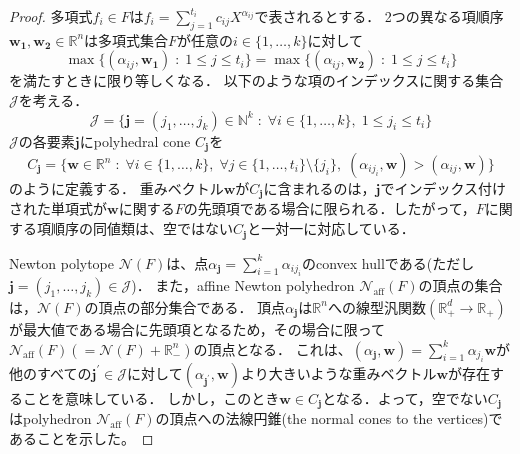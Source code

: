 \begin{proof}
	多項式$f_i \in F$は$\displaystyle f_i = \sum_{j=1}^{t_i}c_{ij}X^{\alpha_{ij}}$で表されるとする．
	2つの異なる項順序$\bm{w_1}, \bm{w_2} \in \mathbb{R}^n$は多項式集合$F$が任意の$i \in \{1, \dots, k\}$に対して
	$$\max \{(\alpha_{ij}, \bm{w_1}) \; : \; 1 \le j \le t_i\} = \max \{(\alpha_{ij}, \bm{w_2}) \; : \; 1 \le j \le t_i\}$$
	を満たすときに限り等しくなる．
	以下のような項のインデックスに関する集合$\mathcal{J}$を考える．
	$$\mathcal{J} = \{ \bm{j} = (j_1, \dots, j_k) \in \mathbb{N}^k \;:\; \forall i \in \{1, \dots, k\}, \; 1 \le j_i \le t_i\}$$
	$\mathcal{J}$の各要素$\bm{j}$にpolyhedral cone $C_{\bm{j}}$を
	$$C_{\bm{j}} = \{\bm{w} \in \mathbb{R}^n \;:\; \forall i \in \{1, \dots, k\}, \; \forall j \in \{1, \dots, t_i\} \setminus \{j_i\}, \; (\alpha_{ij_i}, \bm{w}) > (\alpha_{ij}, \bm{w}) \}$$
	のように定義する．
	重みベクトル$\bm{w}$が$C_{\bm{j}}$に含まれるのは，$\bm{j}$でインデックス付けされた単項式が$\bm{w}$に関する$F$の先頭項である場合に限られる．したがって，$F$に関する項順序の同値類は、空ではない$C_{\bm{j}}$と一対一に対応している．
	\par
	Newton polytope $\mathcal{N}(F)$は、点$\displaystyle \alpha_{\bm{j}} = \sum^k_{i=1} \alpha_{ij_i}$のconvex hullである(ただし$\bm{j} = (j_1, \dots, j_k) \in \mathcal{J}$)．
	また，affine Newton polyhedron $\mathcal{N}_{\mathrm{aff}}(F)$の頂点の集合は，$\mathcal{N}(F)$の頂点の部分集合である．
	頂点$\alpha_{\bm{j}}$は$\mathbb{R}^n$への線型汎関数$(\mathbb{R}_{+}^d \to \mathbb{R}_+)$が最大値である場合に先頭項となるため，その場合に限って$\mathcal{N}_{\mathrm{aff}}(F) (= \mathcal{N}(F) + \mathbb{R}_{-}^n)$の頂点となる．
	これは、$\displaystyle (\alpha_{\bm{j}}, \bm{w}) = \sum_{i = 1}^k \alpha_{j_i}\bm{w}$が他のすべての$\bm{j}^\prime \in \mathcal{J}$に対して$(\alpha_{\bm{j}^\prime}, \bm{w})$より大きいような重みベクトル$\bm{w}$が存在することを意味している．
	しかし，このとき$\bm{w} \in C_{\bm{j}}$となる．よって，空でない$C_{\bm{j}}$はpolyhedron $\mathcal{N}_{\mathrm{aff}}(F)$の頂点への法線円錐(the normal cones to the vertices)であることを示した。
\end{proof}

